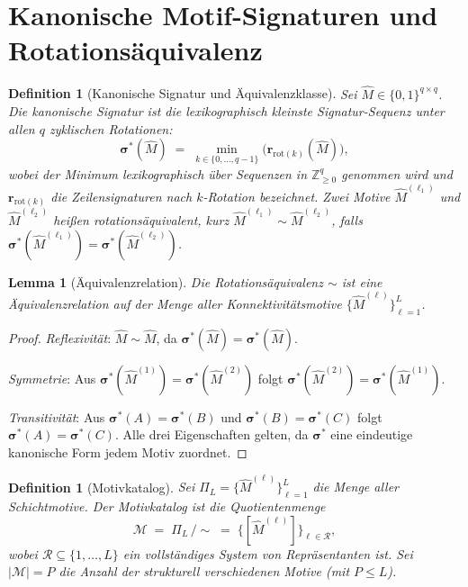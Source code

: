 \documentclass[12pt, a4paper, openany]{report}
\newtheorem{lemma}[theorem]{Lemma}
\newtheorem{definition}[theorem]{Definition}
\newcommand{\calR}{\mathcal{R}}
\newcommand{\calM}{\mathcal{M}}
\newcommand{\Z}{\mathbb{Z}}
\begin{document}
\section{Kanonische Motif-Signaturen und Rotationsäquivalenz}
\label{sec:sgkr_signature}

\begin{definition}[Kanonische Signatur und Äquivalenzklasse]
\label{def:canonical_sig}
Sei $\hat{M} \in \{0,1\}^{q\times q}$.  Die \emph{kanonische Signatur} ist
die lexikographisch kleinste Signatur-Sequenz unter allen $q$ zyklischen
Rotationen:
\begin{equation}
  \label{eq:canonical}
  \bm{\sigma}^*(\hat{M})
  \;=\; \min_{k \in \{0,\ldots,q-1\}}
  \bigl(\bm{r}_{\mathrm{rot}(k)}(\hat{M})\bigr),
\end{equation}
wobei der Minimum lexikographisch über Sequenzen in $\Z_{\geq 0}^q$
genommen wird und $\bm{r}_{\mathrm{rot}(k)}$ die Zeilensignaturen nach
$k$-Rotation bezeichnet.
Zwei Motive $\hat{M}^{(\ell_1)}$ und $\hat{M}^{(\ell_2)}$ heißen
\emph{rotations\-äquivalent}, kurz $\hat{M}^{(\ell_1)} \sim \hat{M}^{(\ell_2)}$,
falls $\bm{\sigma}^*(\hat{M}^{(\ell_1)}) = \bm{\sigma}^*(\hat{M}^{(\ell_2)})$.
\end{definition}

\begin{lemma}[Äquivalenzrelation]
\label{lem:equiv_relation}
Die Rotationsäquivalenz $\sim$ ist eine Äquivalenzrelation auf der Menge
aller Konnektivitätsmotive $\{\hat{M}^{(\ell)}\}_{\ell=1}^{L}$.
\end{lemma}

\begin{proof}
\emph{Reflexivität}: $\hat{M} \sim \hat{M}$, da $\bm{\sigma}^*(\hat{M}) = \bm{\sigma}^*(\hat{M})$.

\emph{Symmetrie}: Aus $\bm{\sigma}^*(\hat{M}^{(1)}) = \bm{\sigma}^*(\hat{M}^{(2)})$
folgt $\bm{\sigma}^*(\hat{M}^{(2)}) = \bm{\sigma}^*(\hat{M}^{(1)})$.

\emph{Transitivität}: Aus $\bm{\sigma}^*(A) = \bm{\sigma}^*(B)$ und
$\bm{\sigma}^*(B) = \bm{\sigma}^*(C)$ folgt $\bm{\sigma}^*(A) = \bm{\sigma}^*(C)$.
Alle drei Eigenschaften gelten, da $\bm{\sigma}^*$ eine eindeutige
kanonische Form jedem Motiv zuordnet.
\end{proof}

\begin{definition}[Motivkatalog]
\label{def:motif_catalog}
Sei $\Pi_L = \{\hat{M}^{(\ell)}\}_{\ell=1}^L$ die Menge aller Schichtmotive.
Der \emph{Motivkatalog} ist die Quotientenmenge
\[
  \calM \;=\; \Pi_L \,/\!\sim
  \;=\; \bigl\{[\hat{M}^{(\ell)}]\bigr\}_{\ell \in \calR},
\]
wobei $\calR \subseteq \{1,\ldots,L\}$ ein vollständiges System von
Repräsentanten ist.  Sei $|\calM| = P$ die Anzahl der strukturell
verschiedenen Motive (mit $P \leq L$).
\end{definition}
\end{document}
